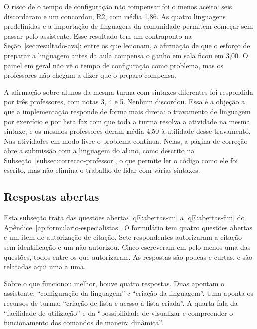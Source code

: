 O risco de o tempo de configuração não compensar foi o menos aceito: seis discordaram e um concordou, R2, com média 1,86. As quatro linguagens predefinidas e a importação de linguagens da comunidade permitem começar sem passar pelo assistente. Esse resultado tem um contraponto na Seção~\ref{sec:resultado-ava}: entre os que lecionam, a afirmação de que o esforço de preparar a linguagem antes da aula compensa o ganho em sala ficou em 3,00. O painel em geral não vê o tempo de configuração como problema, mas os professores não chegam a dizer que o preparo compensa.

A afirmação sobre alunos da mesma turma com sintaxes diferentes foi respondida por três professores, com notas 3, 4 e 5. Nenhum discordou. Essa é a objeção a que a implementação responde de forma mais direta: o travamento de linguagem por exercício e por lista faz com que toda a turma resolva a atividade na mesma sintaxe, e os mesmos professores deram média 4,50 à utilidade desse travamento. Nas atividades em modo livre o problema continua. Nelas, a página de correção abre a submissão com a linguagem do aluno, como descrito na Subseção~\ref{subsec:correcao-professor}, o que permite ler o código como ele foi escrito, mas não elimina o trabalho de lidar com várias sintaxes.

\subsection{Respostas abertas}
\label{sec:resultado-abertas}

Esta subseção trata das questões abertas \ref{qE:abertas-ini} a \ref{qE:abertas-fim} do Apêndice~\ref{ap:formulario-especialistas}. O formulário tem quatro questões abertas e um item de autorização de citação. Sete respondentes autorizaram a citação sem identificação e um não autorizou. Cinco escreveram em pelo menos uma das questões, todos entre os que autorizaram. As respostas são poucas e curtas, e são relatadas aqui uma a uma.

Sobre o que funcionou melhor, houve quatro respostas. Duas apontam o assistente: ``configuração da linguagem'' e ``criação da linguagem''. Uma aponta os recursos de turma: ``criação de lista e acesso à lista criada''. A quarta fala da ``facilidade de utilização'' e da ``possibilidade de visualizar e compreender o funcionamento dos comandos de maneira dinâmica''.

